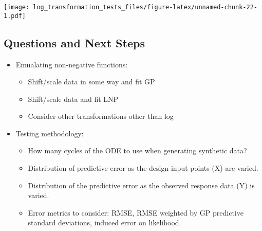 \documentclass[
]{article}
\providecommand{\tightlist}{%
  \setlength{\itemsep}{0pt}\setlength{\parskip}{0pt}}
\begin{document}
\texttt{[image: log\_transformation\_tests\_files/figure-latex/unnamed-chunk-22-1.pdf]}

\hypertarget{questions-and-next-steps}{%
\subsection{Questions and Next Steps}\label{questions-and-next-steps}}

\begin{itemize}
\tightlist
\item
  Emualating non-negative functions:

  \begin{itemize}
  \tightlist
  \item
    Shift/scale data in some way and fit GP
  \item
    Shift/scale data and fit LNP
  \item
    Consider other transformations other than log
  \end{itemize}
\item
  Testing methodology:

  \begin{itemize}
  \tightlist
  \item
    How many cycles of the ODE to use when generating synthetic data?
  \item
    Distribution of predictive error as the design input points (X) are
    varied.
  \item
    Distribution of the predictive error as the observed response data
    (Y) is varied.
  \item
    Error metrics to consider: RMSE, RMSE weighted by GP predictive
    standard deviations, induced error on likelihood.
  \end{itemize}
\end{itemize}
\end{document}
